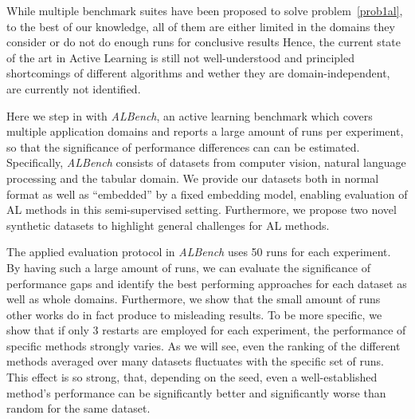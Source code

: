 \documentclass[]{article}
\begin{document}
While multiple benchmark suites have been proposed to solve
problem~\ref{prob1al}, to the best of
our knowledge, all of them are either limited in the domains they consider or do
not do enough runs for conclusive results 
Hence, the current
state of the art in Active Learning is still not well-understood and principled
shortcomings of different algorithms and wether they are 
domain-independent, are currently not identified.

Here we step in with \emph{ALBench}, an active learning benchmark which covers
multiple application domains and reports a large amount of runs per
experiment, so that the significance of performance differences can can be
estimated. Specifically, \emph{ALBench} consists of datasets from
computer vision, natural language processing and the tabular domain. We provide
our datasets both in normal format %
as well as ``embedded'' by a fixed embedding model, enabling evaluation of AL methods in
this semi-supervised setting.
Furthermore, we propose two novel synthetic datasets to highlight general
challenges for AL methods.

The applied evaluation protocol in \emph{ALBench} uses 50 runs for
each experiment. By having such a large amount of runs, we can evaluate the
significance of performance gaps and identify the best performing
approaches for each dataset as well as whole domains. 
Furthermore, we show that the small amount of runs other works do in fact 
produce to misleading results. 
To be more specific, we show that if only 3 restarts are employed for each experiment, 
the performance of specific methods strongly varies. As we will see, even the ranking of
the different methods averaged over many datasets fluctuates with the specific set of runs. 
This effect is so strong, that, depending on the seed, even a well-established method's performance can be significantly better and significantly worse than random for the same dataset. 
\end{document}
